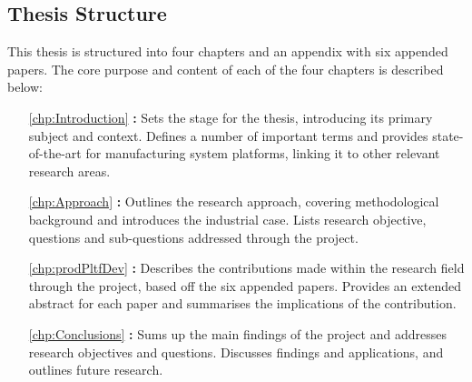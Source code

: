 \subsection{Thesis Structure}\label{sec:thesisStructure}
This thesis is structured into four chapters and an appendix with six appended papers.
The core purpose and content of each of the four chapters is described below:
\begin{itemize}[font={\normalfont}\bfseries]
  \item[\ref{chp:Introduction}] \textbf{:}
  Sets the stage for the thesis, introducing its primary subject and context.
  Defines a number of important terms and provides state-of-the-art for manufacturing system platforms, linking it to other relevant research areas.
  \item[\ref{chp:Approach}] \textbf{:}
  Outlines the research approach, covering methodological background and introduces the industrial case.
  Lists research objective, questions and sub-questions addressed through the \PhD{} project.
  \item[\ref{chp:prodPltfDev}] \textbf{:}
  Describes the contributions made within the research field through the \PhD{} project, based off the six appended papers.
  Provides an extended abstract for each paper and summarises the implications of the contribution.
  \item[\ref{chp:Conclusions}] \textbf{:}
  Sums up the main findings of the \PhD{} project and addresses research objectives and questions.
  Discusses findings and applications, and outlines future research.
\end{itemize}